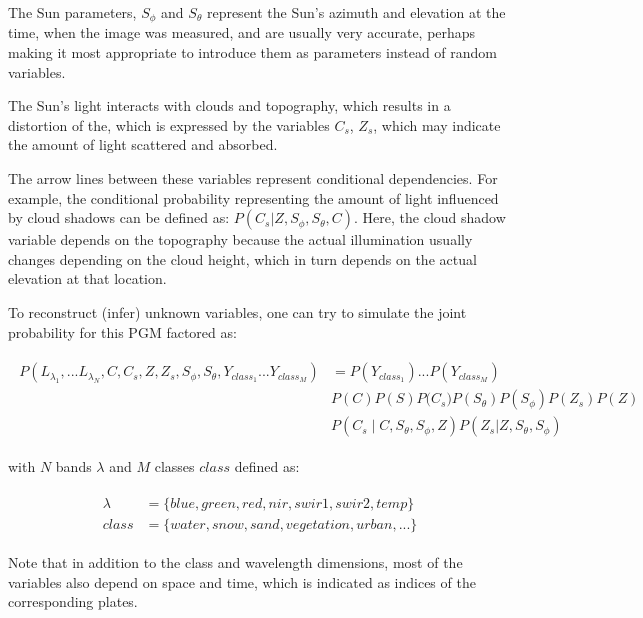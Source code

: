 The Sun parameters, $S_\phi$ and $S_\theta$ represent the Sun's azimuth and elevation at the time, when the image was measured, and are usually very accurate, perhaps making it most appropriate to introduce them as parameters instead of random variables.

The Sun's light interacts with clouds and topography, which results in a distortion of the, which is expressed by the variables $C_s$, $Z_s$, which may indicate the amount of light scattered and absorbed.

The arrow lines between these variables represent conditional dependencies. For example, the conditional probability representing the amount of light influenced by cloud shadows can be defined as: $P(C_s|Z,S_\phi,S_\theta,C)$. Here, the cloud shadow variable depends on the topography because the actual illumination usually changes depending on the cloud height, which in turn depends on the actual elevation at that location.

To reconstruct (infer) unknown variables, one can try to simulate the joint probability for this PGM factored as:

\begin{equation}
\begin{split}
\begin{aligned}
P{(L_{\lambda_1}, ... L_{\lambda_N}, C, C_s, Z, Z_s, S_\phi, S_\theta, Y_{class_1} ... Y_{class_M})} &= P(Y_{class_1}) ... P(Y_{class_M}) \\
& P{(C)} P{(S)} P({C_s)} P{(S_\theta)} P{(S_\phi)}  P{(Z_s)} P{(Z)} \\ 
& P{(C_s \mid C,S_\theta,S_\phi,Z)}  P{(Z_s|Z,S_\theta, S_\phi)}
\end{aligned}
\end{split}
\label{eq:bn-joint}
\end{equation}

with $N$ bands $\lambda$ and $M$ classes $class$ defined as:

\begin{equation}
\begin{split}
\begin{aligned}
\lambda &= \{blue, green, red, nir, swir1, swir2, temp\} \\
class &= \{water, snow, sand, vegetation, urban, ...\}
\end{aligned}
\end{split}
\end{equation}

Note that in addition to the class and wavelength dimensions, most of the variables also depend on space and time, which is indicated as indices of the corresponding plates. 

